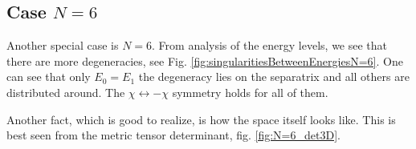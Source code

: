 




\subsection{Case $N=6$}

Another special case is $N=6$. From analysis of the energy levels, we see that there are more degeneracies, see Fig. \ref{fig:singularitiesBetweenEnergiesN=6}. One can see that only $E_0=E_1$ the degeneracy lies on the separatrix and all others are distributed around. The $\chi\leftrightarrow-\chi$ symmetry holds for all of them. 

Another fact, which is good to realize, is how the space itself looks like. This is best seen from the metric tensor determinant, fig. \ref{fig:N=6_det3D}.



